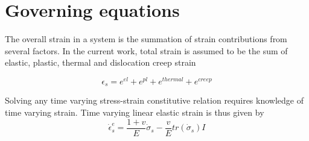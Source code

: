 \section{Governing equations}
The overall strain in a system is the summation of strain contributions from several factors. In the current work, total strain is assumed to be the sum of elastic, plastic, thermal and dislocation creep strain


\begin{equation}
\epsilon_{s} = e^{el} + e^{pl} + e^{thermal} +e^{creep}
\label {strainEq2}
\end{equation}



\begin{comment}

In matrix form, the linear elastic strain for an isotropic material can be written 

\begin{equation} 
\begin{Bmatrix}
 \epsilon_{11}   \\ 
 \epsilon_{22}   \\
 \epsilon_{33}   \\
 \gamma_{12}   \\
 \gamma_{13}   \\
 \gamma_{23}
\end{Bmatrix} = \begin{bmatrix}
 1/E & -v/E & -v/E &  0 &  0 &  0  \\ 
 -v/E & 1/E & -v/E & 0 & 0 & 0  \\ 
 -v/E & -v/E & 1/E &  0 &  0 &  0  \\ 
 0 & 0 & 0 & 1/G & 0 &  0  \\ 
 0 & 0 & 0 & 0 & 1/G & 0  \\ 
 0 & 0 & 0 & 0 & 0 & 1/G  
\end{bmatrix} \begin{Bmatrix}
 \sigma_{11}   \\ 
 \sigma_{22}   \\
 \sigma_{33}   \\
 \sigma_{12}   \\
 \sigma_{13}   \\
 \sigma_{23}
\end{Bmatrix}

\label {strain_matrix}
\end{equation}
\end{comment}

Solving any time varying stress-strain constitutive relation requires knowledge of time varying strain. Time varying linear elastic strain is thus given by
\begin{equation} 
\dot{\epsilon}^{e}_{s} = \frac{1+v}{E}\dot{\sigma}_{s} 
                        - \frac{v}{E}tr(\dot{\sigma}_{s})I
\label {hyperelasticEq}
\end{equation}

